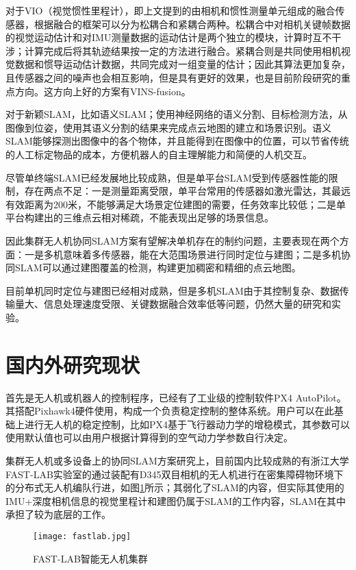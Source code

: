 对于VIO（视觉惯性里程计），即上文提到的由相机和惯性测量单元组成的融合传感器，根据融合的框架可以分为松耦合和紧耦合两种。松耦合中对相机关键帧数据的视觉运动估计和对IMU测量数据的运动估计是两个独立的模块，计算时互不干涉；计算完成后将其轨迹结果按一定的方法进行融合。紧耦合则是共同使用相机视觉数据和惯导运动估计数据，共同完成对一组变量的估计\cite{qin2018vins}；因此其算法更加复杂，且传感器之间的噪声也会相互影响，但是具有更好的效果，也是目前阶段研究的重点方向。这方向上好的方案有VINS-fusion。


对于新颖SLAM，比如语义SLAM；使用神经网络的语义分割、目标检测方法，从图像到位姿，使用其语义分割的结果来完成点云地图的建立和场景识别。语义SLAM能够探测出图像中的各个物体，并且能得到在图像中的位置，可以节省传统的人工标定物品的成本，方便机器人的自主理解能力和简便的人机交互\cite{任伟建2022移动机器人同步定位与建图技术综述}。

尽管单终端SLAM已经发展地比较成熟，但是单平台SLAM受到传感器性能的限制，存在两点不足：一是测量距离受限，单平台常用的传感器如激光雷达，其最远有效距离为200米，不能够满足大场景定位建图的需要，任务效率比较低；二是单平台构建出的三维点云相对稀疏，不能表现出足够的场景信息\cite{高家隆2019多无人机协同定位与建图技术研究}。

因此集群无人机协同SLAM方案有望解决单机存在的制约问题，主要表现在两个方面：一是多机意味着多传感器，能在大范围场景进行同时定位与建图；二是多机协同SLAM可以通过建图覆盖的检测，构建更加稠密和精细的点云地图。

目前单机同时定位与建图已经相对成熟，但是多机SLAM由于其控制复杂、数据传输量大、信息处理速度受限、关键数据融合效率低等问题，仍然大量的研究和实验。

\section{国内外研究现状}

首先是无人机或机器人的控制程序，已经有了工业级的控制软件PX4 AutoPilot。其搭配Pixhawk4硬件使用，构成一个负责稳定控制的整体系统。用户可以在此基础上进行无人机的稳定控制，比如PX4基于飞行器动力学的增稳模式，其参数可以使用默认值也可以由用户根据计算得到的空气动力学参数自行决定。

集群无人机或多设备上的协同SLAM方案研究上，目前国内比较成熟的有浙江大学FAST-LAB实验室的通过装配有D345双目相机的无人机进行在密集障碍物环境下的分布式无人机编队行进，如图\ref{fig-fastlab}所示；其弱化了SLAM的内容，但实际其使用的IMU+深度相机信息的视觉里程计和建图仍属于SLAM的工作内容，SLAM在其中承担了较为底层的工作。

\begin{figure}[!ht]
	\centering
	\texttt{[image: fastlab.jpg]}
	\caption{FAST-LAB智能无人机集群} 
	\label{fig-fastlab}
\end{figure}

